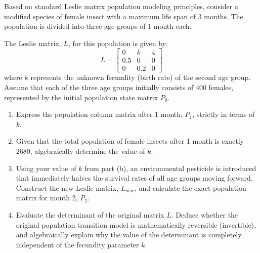 

\begin{problem}
Based on standard Leslie matrix population modeling principles, consider a modified species of female insect with a maximum life span of 3 months. The population is divided into three age groups of 1 month each. 

The Leslie matrix, $L$, for this population is given by:
$$L = \begin{bmatrix} 0 & k & 4 \\ 0.5 & 0 & 0 \\ 0 & 0.2 & 0 \end{bmatrix}$$
where $k$ represents the unknown fecundity (birth rate) of the second age group. Assume that each of the three age groups initially consists of 400 females, represented by the initial population state matrix $P_0$.

\begin{enumerate}[label=\textbf{(\alph*)}]
    \item Express the population column matrix after 1 month, $P_1$, strictly in terms of $k$.
    \item Given that the total population of female insects after 1 month is exactly $2680$, algebraically determine the value of $k$.
    \item Using your value of $k$ from part (b), an environmental pesticide is introduced that immediately halves the survival rates of all age groups moving forward. Construct the new Leslie matrix, $L_{\text{new}}$, and calculate the exact population matrix for month 2, $P_2$.
    \item Evaluate the determinant of the original matrix $L$. Deduce whether the original population transition model is mathematically reversible (invertible), and algebraically explain why the value of the determinant is completely independent of the fecundity parameter $k$.
\end{enumerate}
\end{problem}

